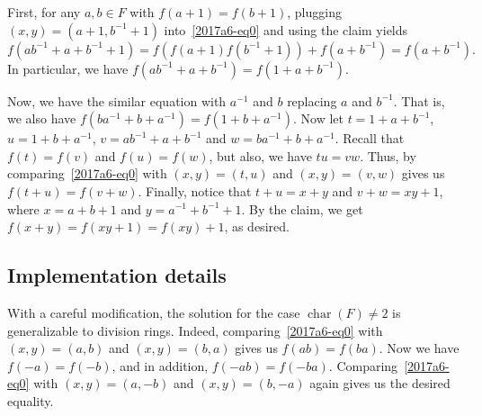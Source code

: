 \documentclass{article}
\DeclareMathOperator{\rchar}{char}
\begin{document}
First, for any $a, b \in F$ with $f(a + 1) = f(b + 1)$, plugging $(x, y) = (a + 1, b^{-1} + 1)$ into~\eqref{2017a6-eq0} and using the claim yields
\[ f(ab^{-1} + a + b^{-1} + 1) = f(f(a + 1) f(b^{-1} + 1)) + f(a + b^{-1}) = f(a + b^{-1}). \]
In particular, we have $f(ab^{-1} + a + b^{-1}) = f(1 + a + b^{-1})$.

Now, we have the similar equation with $a^{-1}$ and $b$ replacing $a$ and $b^{-1}$.
That is, we also have $f(ba^{-1} + b + a^{-1}) = f(1 + b + a^{-1})$.
Now let $t = 1 + a + b^{-1}$, $u = 1 + b + a^{-1}$, $v = ab^{-1} + a + b^{-1}$ and $w = ba^{-1} + b + a^{-1}$.
Recall that $f(t) = f(v)$ and $f(u) = f(w)$, but also, we have $tu = vw$.
Thus, by comparing~\eqref{2017a6-eq0} with $(x, y) = (t, u)$ and $(x, y) = (v, w)$ gives us $f(t + u) = f(v + w)$.
Finally, notice that $t + u = x + y$ and $v + w = xy + 1$, where $x = a + b + 1$ and $y = a^{-1} + b^{-1} + 1$.
By the claim, we get $f(x + y) = f(xy + 1) = f(xy) + 1$, as desired.



\subsection*{Implementation details}

With a careful modification, the solution for the case $\rchar(F) \neq 2$ is generalizable to division rings.
Indeed, comparing~\eqref{2017a6-eq0} with $(x, y) = (a, b)$ and $(x, y) = (b, a)$ gives us $f(ab) = f(ba)$.
Now we have $f(-a) = f(-b)$, and in addition, $f(-ab) = f(-ba)$.
Comparing~\eqref{2017a6-eq0} with $(x, y) = (a, -b)$ and $(x, y) = (b, -a)$ again gives us the desired equality.
\end{document}
